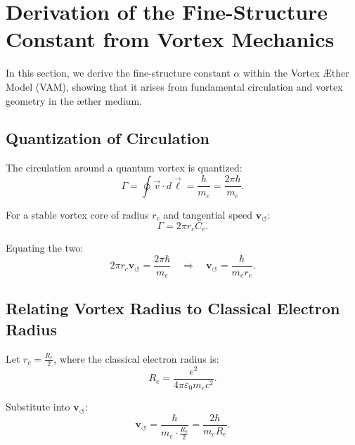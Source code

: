 
\section{Derivation of the Fine-Structure Constant from Vortex Mechanics}
\label{sec:appendix-alpha}

In this section, we derive the fine-structure constant \( \alpha \) within the Vortex Æther Model (VAM), showing that it arises from fundamental circulation and vortex geometry in the æther medium.

\subsection{Quantization of Circulation}

The circulation around a quantum vortex is quantized:
\begin{equation}
    \Gamma = \oint \vec{v} \cdot d\vec{\ell} = \frac{h}{m_e} = \frac{2\pi \hbar}{m_e}.
\end{equation}

For a stable vortex core of radius \( r_c \) and tangential speed \( \mathbf{v}_{\scriptscriptstyle\boldsymbol{\circlearrowleft}} \):
\begin{equation}
    \Gamma = 2\pi r_c C_e.
\end{equation}

Equating the two:
\begin{equation}
    2\pi r_c \mathbf{v}_{\scriptscriptstyle\boldsymbol{\circlearrowleft}} = \frac{2\pi \hbar}{m_e} \quad \Rightarrow \quad \mathbf{v}_{\scriptscriptstyle\boldsymbol{\circlearrowleft}} = \frac{\hbar}{m_e r_c}.
\end{equation}

\subsection{Relating Vortex Radius to Classical Electron Radius}

Let \( r_c = \frac{R_e}{2} \), where the classical electron radius is:
\begin{equation}
    R_e = \frac{e^2}{4\pi \varepsilon_0 m_e c^2}.
\end{equation}

Substitute into \( \mathbf{v}_{\scriptscriptstyle\boldsymbol{\circlearrowleft}} \):
\begin{equation}
    \mathbf{v}_{\scriptscriptstyle\boldsymbol{\circlearrowleft}} = \frac{\hbar}{m_e \cdot \frac{R_e}{2}} = \frac{2\hbar}{m_e R_e}.
\end{equation}


